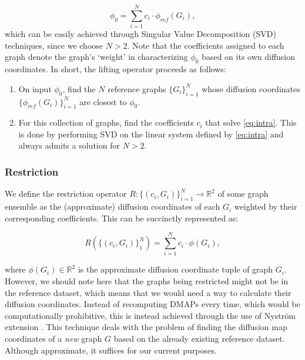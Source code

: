 \begin{equation}
  \label{eq:intra}
  \phi_0 = \sum_{i = 1}^N c_i \cdot \phi_{ref}(G_i),
\end{equation}
which can be easily achieved through Singular Value Decomposition
(SVD) techniques, since we choose $N > 2$. Note that the coefficients
assigned to each graph denote the graph's `weight' in characterizing
$\phi_0$ based on its own diffusion coordinates. In short, the lifting
operator proceeds as follows:
\begin{enumerate}
\item On input $\phi_0$, find the $N$ reference graphs
  $\{G_i\}^N_{i = 1}$ whose diffusion coordinates
  $\{\phi_{ref}(G_i)\}_{i = 1}^N$ are closest to $\phi_0$.

\item For this collection of graphs, find the coefficients $c_i$ that
  solve \ref{eq:intra}. This is done by performing SVD on the linear
  system defined by \ref{eq:intra} and always admits a solution for
  $N > 2$.
\end{enumerate}

\subsubsection{Restriction}

We define the restriction operator
$R: \{(c_i,G_i)\}^N_{i = 1} \rightarrow \mathbb{R}^2$ of some graph
ensemble as the (approximate) diffusion coordinates of each $G_i$
weighted by their corresponding coefficients. This can be succinctly
represented as:

\begin{equation}
  R(\{(c_i,G_i)\}_1^N) = \sum_{i = 1}^N c_i \cdot \phi(G_i),
\end{equation}

\noindent where $\phi(G_i) \in \mathbb{R}^2$ is the approximate
diffusion coordinate tuple of graph $G_i$. However, we should note
here that the graphs being restricted might not be in the reference
dataset, which means that we would need a way to calculate their
diffusion coordinates. Instead of recomputing DMAPs every time, which
would be computationally prohibitive, this is instead achieved through
the use of Nystr\"om extension \cite{fowlkes2004spectral}. This
technique deals with the problem of finding the diffusion map
coordinates of a {\em new} graph $G$ based on the already existing
reference dataset. Although approximate, it suffices for our current
purposes.

